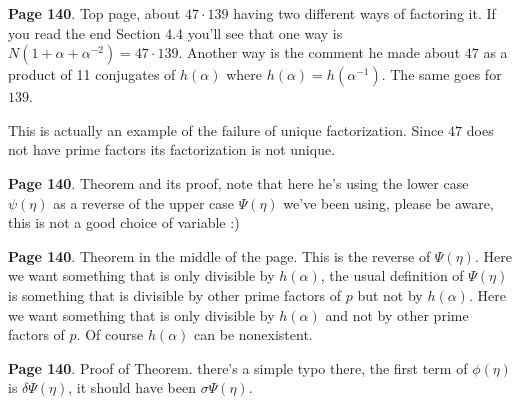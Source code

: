 \documentclass[aps,preprint,preprintnumbers,nofootinbib,showpacs,prd]{revtex4-1}
\begin{document}
{\bf Page 140}. Top page, about $47 \cdot 139$ having two different ways of factoring it. If you read the end Section 4.4 you'll see that one way is $N(1 + \alpha + \alpha^{-2}) = 47 \cdot 139$. Another way is the comment he made about $47$ as a product of 11 conjugates of $h(\alpha)$ where $h(\alpha) = h(\alpha^{-1})$. The same goes for $139$.

This is actually an example of the failure of unique factorization. Since $47$ does not have prime factors its factorization is not unique.

{\bf Page 140}. Theorem and its proof, note that here he's using the lower case $\psi(\eta)$ as a reverse of the upper case $\Psi(\eta)$ we've been using, please be aware, this is not a good choice of variable :)

{\bf Page 140}. Theorem in the middle of the page. This is the reverse of $\Psi(\eta)$. Here we want something that is only divisible by $h(\alpha)$, the usual definition of $\Psi(\eta)$ is something that is divisible by other prime factors of $p$ but not by $h(\alpha)$. Here we want something that is only divisible by $h(\alpha)$ and not by other prime factors of $p$. Of course $h(\alpha)$ can be nonexistent.

{\bf Page 140}. Proof of Theorem. there's a simple typo there, the first term of $\phi(\eta)$ is $\delta\Psi(\eta)$, it should have been $\sigma\Psi(\eta)$.
\end{document}
